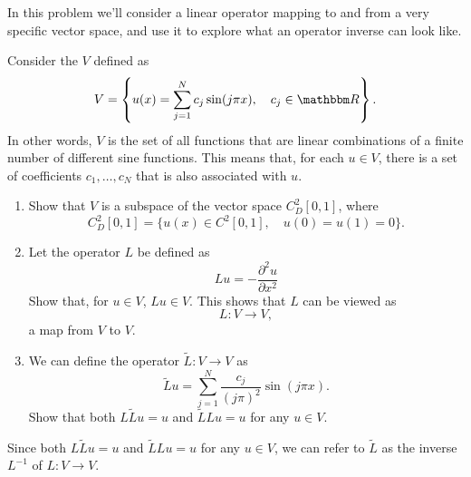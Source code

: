 
In this problem we'll consider a linear operator mapping to and from a very specific vector space, and use it to explore what an operator inverse can look like.  

Consider the $V$ defined as
\[
V = \left\{ u(x) = \sum_{j = 1}^N c_j \sin( j \pi x), \quad c_j \in \R \right\}.
\]
In other words, $V$ is the set of all functions that are linear combinations of a finite number of different sine functions.  This means that, for each $u\in V$, there is a set of coefficients $c_1,\ldots, c_N$ that is also associated with $u$.  

\begin{enumerate}
\item Show that $V$ is a subspace of the vector space $C^2_D[0,1]$, where 
\[
C^2_D[0,1] = \{ u(x)\in C^2[0,1], \quad u(0) = u(1) = 0\}.
\]
\item Let the operator $L$ be defined as
\[
Lu = -\frac{\partial^2 u}{ \partial x^2}
\]
Show that, for $u\in V$, $Lu\in V$.  This shows that $L$ can be viewed as 
\[
L: V\rightarrow V,
\]
a map from $V$ to $V$.
\item We can define the operator $\tilde{L}: V\rightarrow V$ as
\[
\tilde{L} u =  \sum_{j = 1}^N \frac{c_j}{(j\pi)^2} \sin( j \pi x).
\]
Show that both $L\tilde{L}u = u$ and $\tilde{L}Lu = u$ for any $u\in V$.  
\end{enumerate}
Since both $L\tilde{L}u = u$ and $\tilde{L}Lu = u$ for any $u\in V$, we can refer to $\tilde{L}$ as the inverse $L^{-1}$ of $L:V\rightarrow V$.  



